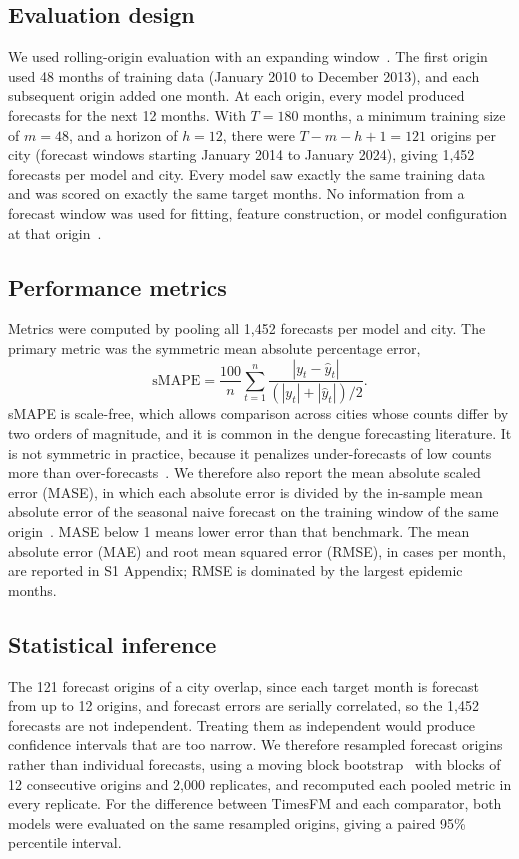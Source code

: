\documentclass[10pt,letterpaper]{article}
\begin{document}
\subsection*{Evaluation design}
We used rolling-origin evaluation with an expanding window~\cite{Tashman2000,Hewamalage2023}. The first origin used 48 months of training data (January 2010 to December 2013), and each subsequent origin added one month. At each origin, every model produced forecasts for the next 12 months. With $T = 180$ months, a minimum training size of $m = 48$, and a horizon of $h = 12$, there were $T - m - h + 1 = 121$ origins per city (forecast windows starting January 2014 to January 2024), giving 1{,}452 forecasts per model and city. Every model saw exactly the same training data and was scored on exactly the same target months. No information from a forecast window was used for fitting, feature construction, or model configuration at that origin~\cite{Kapoor2023}.

\subsection*{Performance metrics}
Metrics were computed by pooling all 1{,}452 forecasts per model and city. The primary metric was the symmetric mean absolute percentage error,
\begin{equation}
\mathrm{sMAPE} = \frac{100}{n}\sum_{t=1}^{n}\frac{|y_t-\hat{y}_t|}{(|y_t|+|\hat{y}_t|)/2}.
\end{equation}
sMAPE is scale-free, which allows comparison across cities whose counts differ by two orders of magnitude, and it is common in the dengue forecasting literature. It is not symmetric in practice, because it penalizes under-forecasts of low counts more than over-forecasts~\cite{Hewamalage2023}. We therefore also report the mean absolute scaled error (MASE), in which each absolute error is divided by the in-sample mean absolute error of the seasonal naive forecast on the training window of the same origin~\cite{HyndmanKoehler2006}. MASE below 1 means lower error than that benchmark. The mean absolute error (MAE) and root mean squared error (RMSE), in cases per month, are reported in S1 Appendix; RMSE is dominated by the largest epidemic months.

\subsection*{Statistical inference}
The 121 forecast origins of a city overlap, since each target month is forecast from up to 12 origins, and forecast errors are serially correlated, so the 1{,}452 forecasts are not independent. Treating them as independent would produce confidence intervals that are too narrow. We therefore resampled forecast origins rather than individual forecasts, using a moving block bootstrap~\cite{Kunsch1989} with blocks of 12 consecutive origins and 2{,}000 replicates, and recomputed each pooled metric in every replicate. For the difference between TimesFM and each comparator, both models were evaluated on the same resampled origins, giving a paired 95\% percentile interval.
\end{document}
